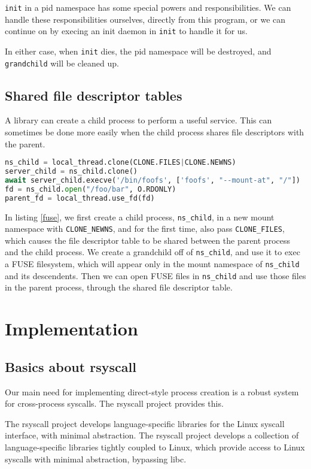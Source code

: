 \documentclass[sigplan]{acmart}
\begin{document}
\texttt{init} in a pid namespace has some special powers and responsibilities.
We can handle these responsibilities ourselves, directly from this program,
or we can continue on by execing an init daemon in \texttt{init} to handle it for us.

In either case, when \texttt{init} dies,
the pid namespace will be destroyed,
and \texttt{grandchild} will be cleaned up.
\subsection{Shared file descriptor tables}
A library can create a child process to perform a useful service.
This can sometimes be done more easily when the child process shares file descriptors with the parent.

\begin{lstlisting}[float=*,language=Python,label={fuse},caption={Shared file descriptor tables}]
ns_child = local_thread.clone(CLONE.FILES|CLONE.NEWNS)
server_child = ns_child.clone()
await server_child.execve('/bin/foofs', ['foofs', "--mount-at", "/"])
fd = ns_child.open("/foo/bar", O.RDONLY)
parent_fd = local_thread.use_fd(fd)
\end{lstlisting}
In listing \ref{fuse},
we first create a child process, \verb|ns_child|, in a new mount namespace with \verb|CLONE_NEWNS|,
and for the first time, also pass \verb|CLONE_FILES|,
which causes the file descriptor table to be shared between the parent process and the child process.
We create a grandchild off of \verb|ns_child|,
and use it to exec a FUSE filesystem,
which will appear only in the mount namespace of \verb|ns_child| and its descendents.
Then we can open FUSE files in \verb|ns_child|
and use those files in the parent process,
through the shared file descriptor table.
\section{Implementation}\label{implementation}
\subsection{Basics about rsyscall}
Our main need for implementing direct-style process creation
is a robust system for cross-process syscalls.
The rsyscall project provides this.

The rsyscall project develops language-specific libraries
for the Linux syscall interface, with minimal abstraction.
The rsyscall project develops a collection of language-specific libraries tightly coupled to Linux,
which provide access to Linux syscalls with minimal abstraction,
bypassing libc.
\end{document}
